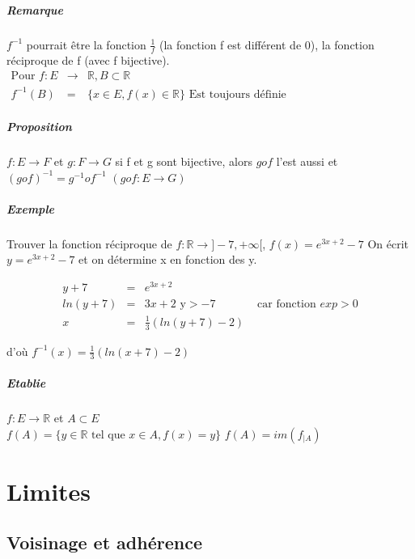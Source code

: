 \paragraph{Remarque} $f^{-1}$ pourrait être la fonction $\frac{1}{f}$ (la fonction f est différent de 0), la fonction réciproque de f (avec f bijective).
~\\
$\begin{array}{rcl}
	\text{Pour } f : E & \rightarrow & \mathbb{R}, B \subset \mathbb{R} \\
	f^{-1}(B) & = & \{x \in E, f(x) \in \mathbb{R}\} \text{ Est toujours définie}
\end{array}$


\paragraph{Proposition} $ f : E \rightarrow F$ et $g:F \rightarrow G$
si f et g sont bijective, alors $gof$ l'est aussi et $(gof)^{-1} = g^{-1}of^{-1}$ $(gof : E \rightarrow G)$

\paragraph{Exemple} Trouver la fonction réciproque de $f : \mathbb{R} \rightarrow ]-7, +\infty[ $, $f(x) = e^{3x+2} - 7$
On écrit $y = e^{3x+2}-7$ et on détermine x en fonction des y.

\[\begin{array}{rclr}
	y + 7 & = & e^{3x+2} \\
		ln(y+7) & = & 3x + 2  \text{ y} > -7 & \text{ car fonction } exp > 0\\
	x &=& \frac{1}{3}(ln(y+7)-2)
\end{array}\]

d'où $f^{-1}(x) = \frac{1}{3}(ln(x+7)-2)$

\paragraph{Etablie} $f : E \rightarrow \mathbb{R}$ et $A \subset E$ ~\\
$f(A) = \{y \in \mathbb{R} \text{ tel que } x \in A, f(x) = y\}$
$f(A) = im(f_{|A})$

\chapter{Limites}

\section{Voisinage et adhérence}
